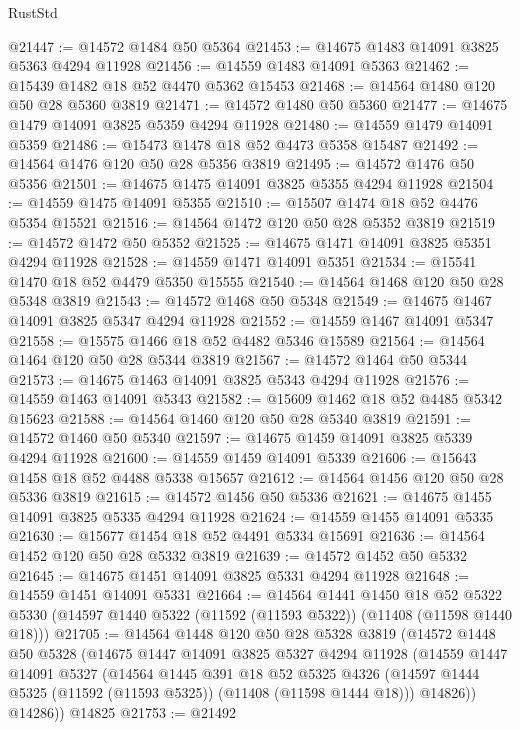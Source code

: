 \begin{lexlean}{RustStd}
\begin{coremodule}
@21447 := @14572 @1484 @50 @5364
@21453 := @14675 @1483 @14091 @3825 @5363 @4294 @11928
@21456 := @14559 @1483 @14091 @5363
@21462 := @15439 @1482 @18 @52 @4470 @5362 @15453
@21468 := @14564 @1480 @120 @50 @28 @5360 @3819
@21471 := @14572 @1480 @50 @5360
@21477 := @14675 @1479 @14091 @3825 @5359 @4294 @11928
@21480 := @14559 @1479 @14091 @5359
@21486 := @15473 @1478 @18 @52 @4473 @5358 @15487
@21492 := @14564 @1476 @120 @50 @28 @5356 @3819
@21495 := @14572 @1476 @50 @5356
@21501 := @14675 @1475 @14091 @3825 @5355 @4294 @11928
@21504 := @14559 @1475 @14091 @5355
@21510 := @15507 @1474 @18 @52 @4476 @5354 @15521
@21516 := @14564 @1472 @120 @50 @28 @5352 @3819
@21519 := @14572 @1472 @50 @5352
@21525 := @14675 @1471 @14091 @3825 @5351 @4294 @11928
@21528 := @14559 @1471 @14091 @5351
@21534 := @15541 @1470 @18 @52 @4479 @5350 @15555
@21540 := @14564 @1468 @120 @50 @28 @5348 @3819
@21543 := @14572 @1468 @50 @5348
@21549 := @14675 @1467 @14091 @3825 @5347 @4294 @11928
@21552 := @14559 @1467 @14091 @5347
@21558 := @15575 @1466 @18 @52 @4482 @5346 @15589
@21564 := @14564 @1464 @120 @50 @28 @5344 @3819
@21567 := @14572 @1464 @50 @5344
@21573 := @14675 @1463 @14091 @3825 @5343 @4294 @11928
@21576 := @14559 @1463 @14091 @5343
@21582 := @15609 @1462 @18 @52 @4485 @5342 @15623
@21588 := @14564 @1460 @120 @50 @28 @5340 @3819
@21591 := @14572 @1460 @50 @5340
@21597 := @14675 @1459 @14091 @3825 @5339 @4294 @11928
@21600 := @14559 @1459 @14091 @5339
@21606 := @15643 @1458 @18 @52 @4488 @5338 @15657
@21612 := @14564 @1456 @120 @50 @28 @5336 @3819
@21615 := @14572 @1456 @50 @5336
@21621 := @14675 @1455 @14091 @3825 @5335 @4294 @11928
@21624 := @14559 @1455 @14091 @5335
@21630 := @15677 @1454 @18 @52 @4491 @5334 @15691
@21636 := @14564 @1452 @120 @50 @28 @5332 @3819
@21639 := @14572 @1452 @50 @5332
@21645 := @14675 @1451 @14091 @3825 @5331 @4294 @11928
@21648 := @14559 @1451 @14091 @5331
@21664 := @14564
    @1441
    @1450
    @18
    @52
    @5322
    @5330
    (@14597 @1440 @5322 (@11592 (@11593 @5322)) (@11408 (@11598 @1440 @18)))
@21705 := @14564
    @1448
    @120
    @50
    @28
    @5328
    @3819
    (@14572
      @1448
      @50
      @5328
      (@14675
        @1447
        @14091
        @3825
        @5327
        @4294
        @11928
        (@14559
          @1447
          @14091
          @5327
          (@14564
            @1445
            @391
            @18
            @52
            @5325
            @4326
            (@14597 @1444 @5325 (@11592 (@11593 @5325)) (@11408 (@11598 @1444 @18)))
            @14826))
        @14286))
    @14825
@21753 := @21492

\end{coremodule}
\end{lexlean}
